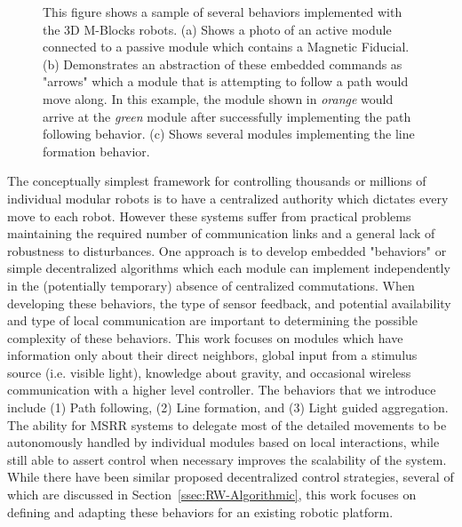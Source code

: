 \begin{figure}[t]
\begin{subfigure}[b]{\linewidth}
	\end{subfigure}
	
	
	\caption{This figure shows a sample of several behaviors implemented with the 3D M-Blocks robots. (a) Shows a photo of an active module connected to a passive module which contains a Magnetic Fiducial. (b) Demonstrates an abstraction of these embedded commands as "arrows" which a module that is attempting to follow a path would move along. In this example, the module shown in \emph{orange} would arrive at the \emph{green} module after successfully implementing the path following behavior. (c) Shows several modules implementing the line formation behavior.}
	
	\label{fig:intro}
\end{figure}

The conceptually simplest framework for controlling thousands or millions of individual modular robots is to have a centralized authority which dictates every move to each robot. However these systems suffer from practical problems maintaining the required number of communication links and a general lack of robustness to disturbances. One approach is to develop embedded "behaviors" or simple decentralized algorithms which each module can implement independently in the (potentially temporary) absence of centralized commutations. When developing these behaviors, the type of sensor feedback, and potential availability and type of local communication are important to determining the possible complexity of these behaviors. This work focuses on modules which have information only about their direct neighbors, global input from a stimulus source (i.e. visible light), knowledge about gravity, and occasional wireless communication with a higher level controller. The behaviors that we introduce include (1) Path following, (2) Line formation, and (3) Light guided aggregation. The ability for MSRR systems to delegate most of the detailed movements to be autonomously handled by individual modules based on local interactions, while still able to assert control when necessary improves the scalability of the system. While there have been similar proposed decentralized control strategies, several of which are discussed in Section~\ref{ssec:RW-Algorithmic}, this work focuses on defining and adapting these behaviors for an existing robotic platform.

